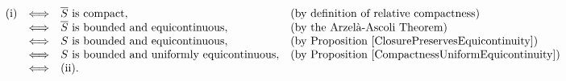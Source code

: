 \begin{equation*}
\begin{array}{ccll}
\textnormal{(i)}
&\Longleftrightarrow& \textnormal{$\overline{S}$ is compact}, & \textnormal{(by definition of relative compactness)}
\\
&\Longleftrightarrow& \textnormal{$\overline{S}$ is bounded and equicontinuous}, & \textnormal{(by the Arzel\`{a}-Ascoli Theorem)}
\\
&\Longleftrightarrow& \textnormal{$S$ is bounded and equicontinuous}, & \textnormal{(by Proposition \ref{ClosurePreservesEquicontinuity})}
\\
&\Longleftrightarrow& \textnormal{$S$ is bounded and uniformly equicontinuous}, & \textnormal{(by Proposition \ref{CompactnessUniformEquicontinuity})}
\\
&\Longleftrightarrow& \textnormal{(ii)}.
\end{array}
\end{equation*}

